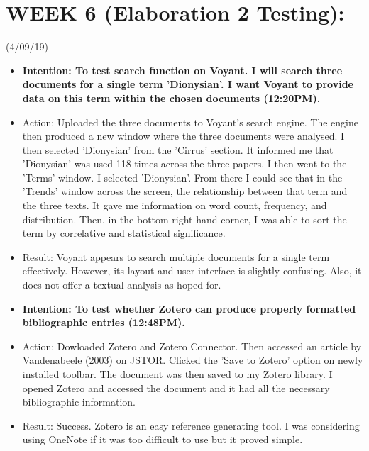 \documentclass[a4paper,12pt]{article}
\begin{document}
\begin{itemize}
\begin{itemize}
\end{itemize}

\section{WEEK 6 (Elaboration 2 Testing):}

(4/09/19)

\begin{itemize}

\item \textbf {Intention: To test search function on Voyant. I will search three documents for a single term 'Dionysian'. I want Voyant to provide data on this term within the chosen documents (12:20PM).} 

\item Action: Uploaded the three documents to Voyant's search engine. The engine then produced a new window where the three documents were analysed. I then selected 'Dionysian' from the 'Cirrus' section. It informed me that 'Dionysian' was used 118 times across the three papers. I then went to the 'Terms' window. I selected 'Dionysian'. From there I could see that in the 'Trends' window across the screen, the relationship between that term and the three texts. It gave me information on word count, frequency, and distribution. Then, in the bottom right hand corner, I was able to sort the term by correlative and statistical significance. 

\item Result: Voyant appears to search multiple documents for a single term effectively. However, its layout and user-interface is slightly confusing. Also, it does not offer a textual analysis as hoped for. 

\item \textbf {Intention: To test whether Zotero can produce properly formatted bibliographic entries (12:48PM).}

\item Action: Dowloaded Zotero and Zotero Connector. Then accessed an article by Vandenabeele (2003) on JSTOR. Clicked the 'Save to Zotero' option on newly installed toolbar. The document was then saved to my Zotero library. I opened Zotero and accessed the document and it had all the necessary bibliographic information.

\item Result: Success. Zotero is an easy reference generating tool. I was considering using OneNote if it was too difficult to use but it proved simple.  
    
    
    
\end{itemize}
\end{document}
